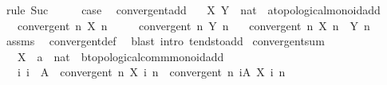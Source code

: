 \begin{isabellebody}
\ {\isacharparenleft}{\kern0pt}rule\ Suc{\isacharparenright}{\kern0pt}\isanewline
\ \ \isamarkupfalse%
\ \isamarkupfalse%
\ {\isacharquery}{\kern0pt}case\ \isacommand{{\isachardot}{\kern0pt}}\isamarkupfalse%
\isanewline
{}\isamarkupfalse%
%
\endisatagproof
{\isafoldproof}%
%
\isadelimproof
\isanewline
%
\endisadelimproof
\isanewline
{}\isamarkupfalse%
\ convergent{\isacharunderscore}{\kern0pt}add{\isacharcolon}{\kern0pt}\isanewline
\ \ \ X\ Y\ {\isacharcolon}{\kern0pt}{\isacharcolon}{\kern0pt}\ {\isachardoublequoteopen}nat\ {\isasymRightarrow}\ {\isacharprime}{\kern0pt}a{\isacharcolon}{\kern0pt}{\isacharcolon}{\kern0pt}topological{\isacharunderscore}{\kern0pt}monoid{\isacharunderscore}{\kern0pt}add{\isachardoublequoteclose}\isanewline
\ \ \ {\isachardoublequoteopen}convergent\ {\isacharparenleft}{\kern0pt}{\isasymlambda}n{\isachardot}{\kern0pt}\ X\ n{\isacharparenright}{\kern0pt}{\isachardoublequoteclose}\isanewline
\ \ \ \ \ {\isachardoublequoteopen}convergent\ {\isacharparenleft}{\kern0pt}{\isasymlambda}n{\isachardot}{\kern0pt}\ Y\ n{\isacharparenright}{\kern0pt}{\isachardoublequoteclose}\isanewline
\ \ \ {\isachardoublequoteopen}convergent\ {\isacharparenleft}{\kern0pt}{\isasymlambda}n{\isachardot}{\kern0pt}\ X\ n\ {\isacharplus}{\kern0pt}\ Y\ n{\isacharparenright}{\kern0pt}{\isachardoublequoteclose}\isanewline
%
\isadelimproof
\ \ %
\endisadelimproof
%
\isatagproof
{}\isamarkupfalse%
\ assms\ \isamarkupfalse%
\ convergent{\isacharunderscore}{\kern0pt}def\ \isamarkupfalse%
\ {\isacharparenleft}{\kern0pt}blast\ intro{\isacharcolon}{\kern0pt}\ tendsto{\isacharunderscore}{\kern0pt}add{\isacharparenright}{\kern0pt}%
\endisatagproof
{\isafoldproof}%
%
\isadelimproof
\isanewline
%
\endisadelimproof
\isanewline
{}\isamarkupfalse%
\ convergent{\isacharunderscore}{\kern0pt}sum{\isacharcolon}{\kern0pt}\isanewline
\ \ \ X\ {\isacharcolon}{\kern0pt}{\isacharcolon}{\kern0pt}\ {\isachardoublequoteopen}{\isacharprime}{\kern0pt}a\ {\isasymRightarrow}\ nat\ {\isasymRightarrow}\ {\isacharprime}{\kern0pt}b{\isacharcolon}{\kern0pt}{\isacharcolon}{\kern0pt}topological{\isacharunderscore}{\kern0pt}comm{\isacharunderscore}{\kern0pt}monoid{\isacharunderscore}{\kern0pt}add{\isachardoublequoteclose}\isanewline
\ \ \ {\isachardoublequoteopen}{\isacharparenleft}{\kern0pt}{\isasymAnd}i{\isachardot}{\kern0pt}\ i\ {\isasymin}\ A\ {\isasymLongrightarrow}\ convergent\ {\isacharparenleft}{\kern0pt}{\isasymlambda}n{\isachardot}{\kern0pt}\ X\ i\ n{\isacharparenright}{\kern0pt}{\isacharparenright}{\kern0pt}\ {\isasymLongrightarrow}\ convergent\ {\isacharparenleft}{\kern0pt}{\isasymlambda}n{\isachardot}{\kern0pt}\ {\isasymSum}i{\isasymin}A{\isachardot}{\kern0pt}\ X\ i\ n{\isacharparenright}{\kern0pt}{\isachardoublequoteclose}\isanewline

\end{isabellebody}
